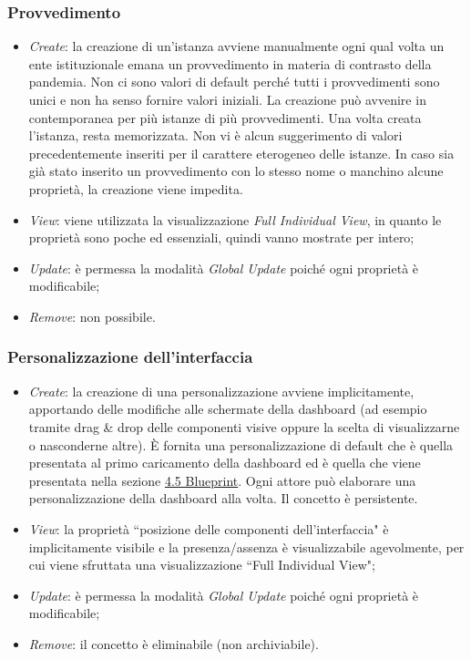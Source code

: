 \subsubsection{Provvedimento}
\label{sss:operazioni-provvedimento}
\begin{itemize}
    \item \textit{Create}: la creazione di un'istanza avviene manualmente ogni qual volta un ente istituzionale emana un provvedimento in materia di contrasto della pandemia.
    Non ci sono valori di default perché tutti i provvedimenti sono unici e non ha senso fornire valori iniziali.
    La creazione può avvenire in contemporanea per più istanze di più provvedimenti.
    Una volta creata l'istanza, resta memorizzata.
    Non vi è alcun suggerimento di valori precedentemente inseriti per il carattere eterogeneo delle istanze.
    In caso sia già stato inserito un provvedimento con lo stesso nome o manchino alcune proprietà, la creazione viene impedita.
    \item \textit{View}: viene utilizzata la visualizzazione \textit{Full Individual View}, in quanto le proprietà sono poche ed essenziali, quindi vanno mostrate per intero;
    \item \textit{Update}: è permessa la modalità \textit{Global Update} poiché ogni proprietà è modificabile;
    \item \textit{Remove}: non possibile.
\end{itemize}

\subsubsection{Personalizzazione dell'interfaccia}
\label{sss:operazioni-personalizzazione-interfaccia}
\begin{itemize}
    \item \textit{Create}: la creazione di una personalizzazione avviene implicitamente, apportando delle modifiche alle schermate della dashboard (ad esempio tramite drag \& drop delle componenti visive oppure la scelta di visualizzarne o nasconderne altre).
    È fornita una personalizzazione di default che è quella presentata al primo caricamento della dashboard ed è quella che viene presentata nella sezione \hyperref[s:struttura-blueprint]{4.5 Blueprint}.
    Ogni attore può elaborare una personalizzazione della dashboard alla volta.
    Il concetto è persistente.
    \item \textit{View}: la proprietà ``posizione delle componenti dell'interfaccia" è implicitamente visibile e la presenza/assenza è visualizzabile agevolmente, per cui viene sfruttata una visualizzazione ``Full Individual View";
    \item \textit{Update}: è permessa la modalità \textit{Global Update} poiché ogni proprietà è modificabile;
    \item \textit{Remove}: il concetto è eliminabile (non archiviabile).
\end{itemize}